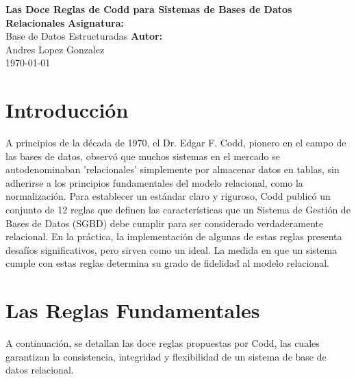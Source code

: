 \documentclass[12pt, a4paper]{article}
\begin{document}
\begin{titlepage}
    \centering
    {\Huge\bfseries Las Doce Reglas de Codd para Sistemas de Bases de Datos Relacionales}
    \vspace{1.5cm}
    \vfill
    {\Large\bfseries Asignatura:} \\
    {\large Base de Datos Estructuradas}
    \vspace{2cm}
    \vfill
    {\Large\bfseries Autor:} \\
    {\large Andres Lopez Gonzalez}\\ %
    {\large \today}
\end{titlepage}

\newpage


\section*{Introducción}

A principios de la década de 1970, el Dr. Edgar F. Codd, pionero en el campo de las bases de datos, observó que muchos sistemas en el mercado se autodenominaban 'relacionales' simplemente por almacenar datos en tablas, sin adherirse a los principios fundamentales del modelo relacional, como la normalización. Para establecer un estándar claro y riguroso, Codd publicó un conjunto de 12 reglas que definen las características que un Sistema de Gestión de Bases de Datos (SGBD) debe cumplir para ser considerado verdaderamente relacional. En la práctica, la implementación de algunas de estas reglas presenta desafíos significativos, pero sirven como un ideal. La medida en que un sistema cumple con estas reglas determina su grado de fidelidad al modelo relacional.

\section*{Las Reglas Fundamentales}
A continuación, se detallan las doce reglas propuestas por Codd, las cuales garantizan la consistencia, integridad y flexibilidad de un sistema de base de datos relacional.
\end{document}
